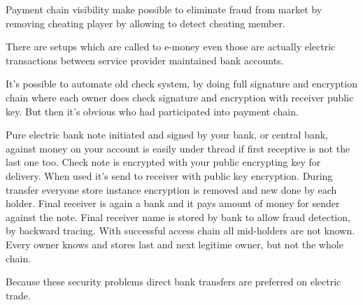 Payment chain visibility make possible to eliminate fraud from market by
removing cheating player by allowing to detect cheating member.

There are
setups which are called to e-money even those are actually electric
transactions between service provider maintained bank accounts.

It's possible to automate old check system, by doing full signature and
encryption chain where each owner does check signature and encryption with
receiver public key. But then it's obvious who had participated into payment
chain.

Pure electric bank note initiated and signed by your bank, or central bank,
against money on your account is easily under thread if first receptive is not
the last one too. Check note is encrypted with your public encrypting key for
delivery. When used it's send to receiver with public key encryption. During
transfer everyone store instance encryption is removed and new done by each
holder. Final receiver is again a bank and it pays amount of money for sender
against the note. Final receiver name is stored by bank to allow fraud
detection, by backward tracing. With successful access chain all mid-holders
are not known. Every owner knows and stores last and next legitime owner, but
not the whole chain.

Because these security problems direct bank transfers are preferred on
electric trade.

